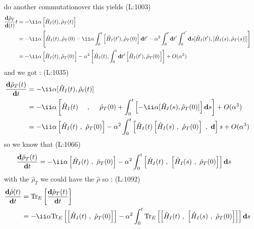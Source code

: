  do another commutationover this yields
(L:1003)
\begin{equation}
\begin{split}
\dfrac{\bold{d}\hat{\rho }_{T }}{\bold{d}(t )}t &=-\ii \alpha \left[\hat{H }_{I }(t ),\hat{\rho }_{T }(t )\right]\\
&=-\ii \alpha \left[\hat{H }_{I }(t ),\hat{\rho }_{T }(0)-\ii \alpha \int _{0}^{t }\left[\hat{H }_{I }(t '),\hat{\rho }_{T }(0)\right]\bold{d}t '-\alpha ^{2}\int _{0}^{t }\bold{d}t '\int _{0}^{t '}\bold{d}s [\hat{H }_{I }(t '),[\hat{H }_{I }(s ),\hat{\rho }_{T }(s )]]\right]\\
&=-\ii \alpha \left[\hat{H }_{I }(t ),\hat{\rho }_{T }(0)\right]-\alpha ^{2}\left[\hat{H }_{I }(t ),\int _{0}^{t }\bold{d}t '\left[\hat{H }_{I }(t '),\hat{\rho }_{T }(0)\right]\right]+O (\alpha ^{3})\end{split}
\end{equation}
 and we got : 
(L:1035)
\begin{equation}
\begin{split}
\dfrac{\bold{d}\hat{\rho }_{T }(t )}{\bold{d}t }&=-\ii \alpha [\hat{H }_{I }(t ),\hat{\rho }_{t }(t )]\\
&=-\ii \alpha \left[\hat{H }_{I }(t )\ \ \ \ ,\ \ \ \ \hat{\rho }_{T }(0)+\int _{0}^{t }\left[-\ii \alpha [\hat{H }_{I }(s ),\hat{\rho }_{T }(0)]\right]\bold{d}s \right]+O (\alpha ^{3})\\
&=-\ii \alpha \left[\hat{H }_{I }(t )\ ,\ \hat{\rho }_{T }(0)\right]-\alpha ^{2}\int _{0}^{t }\left[\hat{H }_{I }(t )\left[\hat{H }_{I }(s )\ ,\ \hat{\rho }_{T }(0)\right]\ ,\ \bold{d}\right]s +O (\alpha ^{3})\end{split}
\end{equation}
 so we know that 
(L:1066)
\begin{equation}
\begin{split}
\dfrac{\bold{d}\hat{\rho }_{T }(t )}{\bold{d}t }&=-\ii \alpha \left[\hat{H }_{I }(t )\ ,\ \hat{\rho }_{T }(0)\right]-\alpha ^{2}\int _{0}^{t }\left[\hat{H }_{I }(t )\ ,\ \left[\hat{H }_{I }(s )\ ,\ \hat{\rho }_{T }(0)\right]\right]\bold{d}s \end{split}
\end{equation}
 with the
 $ \hat{\rho }_{T } $  we could have the
 $ \hat{\rho } $  so : 
(L:1092)
\begin{equation}
\begin{split}
\dfrac{\bold{d}\hat{\rho }(t )}{\bold{d}t }&=\text{Tr}_{E }\left[\dfrac{\bold{d}\hat{\rho }_{T }(t )}{\bold{d}t }\right]\\
&=-\ii \alpha \text{Tr}_{E }\left[\left[\hat{H }_{I }(t )\ ,\ \hat{\rho }_{T }(0)\right]\right]-\alpha ^{2}\int _{0}^{t }\text{Tr}_{E }\left[\left[\hat{H }_{I }(t )\ ,\ \left[\hat{H }_{I }(s )\ ,\ \hat{\rho }_{T }(0)\right]\right]\right]\bold{d}s \end{split}
\end{equation}
